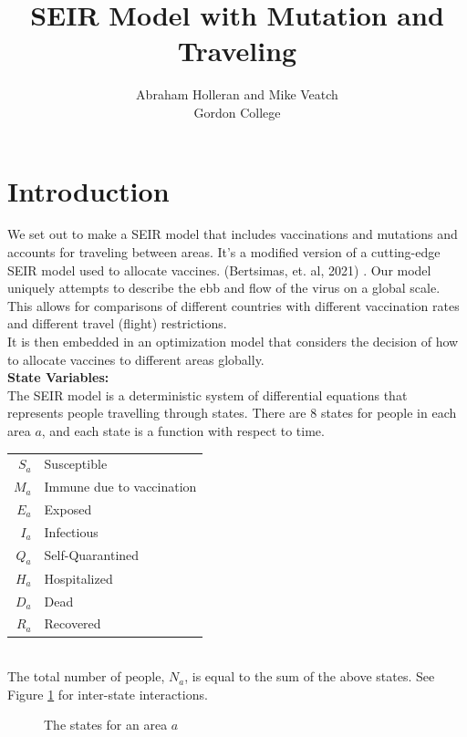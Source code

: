 \documentclass{article}
\title{SEIR Model with Mutation and Traveling}
\author{Abraham Holleran and Mike Veatch\\Gordon College}
\begin{document}
\maketitle
\section{Introduction}
We set out to make a SEIR model that includes vaccinations and mutations and accounts for traveling between areas. It's a modified version of a cutting-edge SEIR model used to allocate vaccines. (Bertsimas, et. al, 2021) \cite{a1}. Our model uniquely attempts to describe the ebb and flow of the virus on a global scale. This allows for comparisons of different countries with different vaccination rates and different travel (flight) restrictions.\\
It is then embedded in an optimization model that considers the decision of how to allocate vaccines to different areas globally.\\
\textbf{State Variables:}\\
The SEIR model is a deterministic system of differential equations that represents people travelling through states. There are 8 states for people in each area $a$, and each state is a function with respect to time.\\
\begin{tabular}{rl}
$S_a$ &Susceptible\\
$M_a$ &Immune due to vaccination\\
$E_a$ &Exposed\\
$I_a$ &Infectious\\
$Q_a$ &Self-Quarantined\\
$H_a$ &Hospitalized\\
$D_a$ &Dead\\
$R_a$ &Recovered\\
\end{tabular}\\
The total number of people, $N_a$, is equal to the sum of the above states. See Figure \ref{fig:SEIR} for inter-state interactions. \\
\begin{figure}[!ht]
    \centering
{}
    \caption{The states for an area $a$}
    \label{fig:SEIR}
\end{figure}
\end{document}
